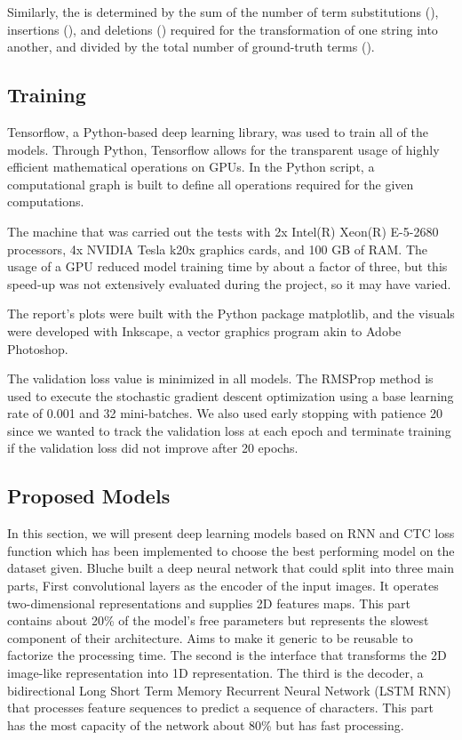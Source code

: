 \documentclass[preprint,12pt]{elsarticle}
\begin{document}
Similarly, the  is determined by the sum of the number of term substitutions (), insertions (), and deletions () required for the transformation of one string into another, and divided by the total number of ground-truth terms (). 



\subsection{Training}
Tensorflow\cite{abadi2016tensorflow}, a Python-based deep learning library, was used to train all of the models. Through Python, Tensorflow allows for the transparent usage of highly efficient mathematical operations on GPUs. In the Python script, a computational graph is built to define all operations required for the given computations.

The machine that was carried out the tests with 2x Intel(R) Xeon(R) E-5-2680 processors, 4x NVIDIA Tesla k20x graphics cards, and 100 GB of RAM. The usage of a GPU reduced model training time by about a factor of three, but this speed-up was not extensively evaluated during the project, so it may have varied.

The report's plots were built with the Python package matplotlib, and the visuals were developed with Inkscape, a vector graphics program akin to Adobe Photoshop.

The validation loss value is minimized in all models. The RMSProp method\cite{hinton2012neural} is used to execute the stochastic gradient descent optimization using a base learning rate of 0.001 and 32 mini-batches. We also used early stopping with patience 20 since we wanted to track the validation loss at each epoch and terminate training if the validation loss did not improve after 20 epochs.

\subsection{Proposed Models}
In this section, we will present deep learning models based on RNN and CTC loss function which has been implemented to choose the best performing model on the dataset given. Bluche \cite{bluche2017gated} built a deep neural network that could split into three main parts, First convolutional layers as the encoder of the input images. It operates two-dimensional representations and supplies 2D features maps. This part contains about 20\% of the model’s free parameters but represents the slowest component of their architecture. Aims to make it generic to be reusable to factorize the processing time. The second is the interface that transforms the 2D image-like representation into 1D representation. The third is the decoder, a bidirectional Long Short Term Memory Recurrent Neural Network (LSTM RNN) that processes feature sequences to predict a sequence of characters. This part has the most capacity of the network about 80\% but has fast processing.
\end{document}
